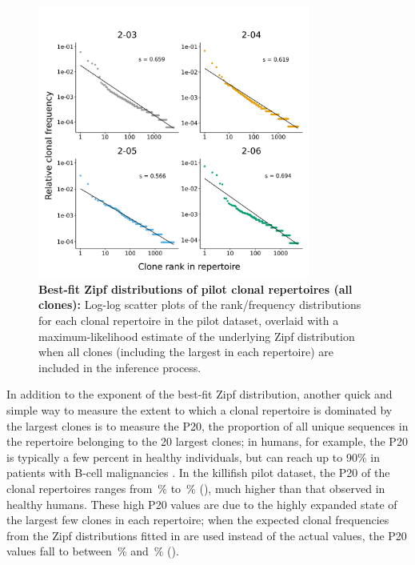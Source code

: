 \begin{figure}
\centering
\includegraphics[width=0.8\textwidth]{_Figures/png/pilot-clones-zipf-fit-null}
\caption[Best-fit Zipf distributions of pilot clonal repertoires (all clones)]{\textbf{Best-fit Zipf distributions of pilot clonal repertoires (all clones):} Log-log scatter plots of the rank/frequency distributions for each clonal repertoire in the pilot dataset, overlaid with a maximum-likelihood estimate of the underlying Zipf distribution when all clones (including the largest in each repertoire) are included in the inference process.}
\label{fig:igseq-pilot-clones-zipf-fit-null}
\end{figure}

In addition to the exponent of the best-fit Zipf distribution, another quick and simple way to measure the extent to which a clonal repertoire is dominated by the largest clones is to measure the P20, the proportion of all unique sequences in the repertoire belonging to the 20 largest clones; in humans, for example, the P20 is typically a few percent in healthy individuals, but can reach up to 90\% in patients with B-cell malignancies \parencite{rosenfeld2018clonesize}. In the killifish pilot dataset, the P20 of the clonal repertoires ranges from \,\% to \,\% (), much higher than that observed in healthy humans. These high P20 values are due to the highly expanded state of the largest few clones in each repertoire; when the expected clonal frequencies from the Zipf distributions fitted in  are used instead of the actual values, the P20 values fall to between \,\% and \,\% ().

